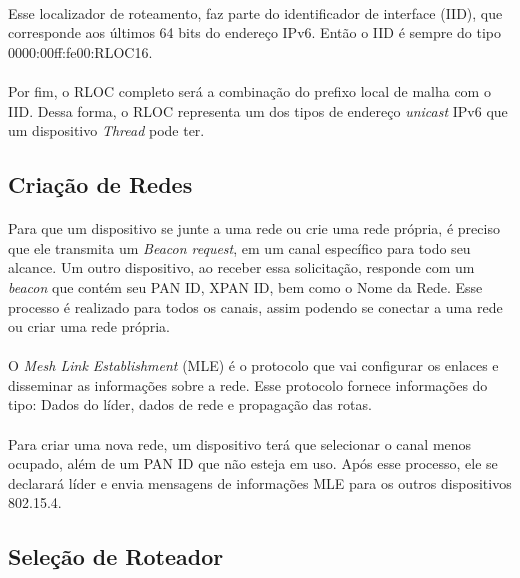 \paragraph{} Esse localizador de roteamento, faz parte do identificador de interface (IID), que corresponde aos últimos 64 bits do endereço IPv6. Então o IID é sempre do tipo 0000:00ff:fe00:RLOC16.

\paragraph{} Por fim, o RLOC completo será a combinação do prefixo local de malha com o IID. Dessa forma, o RLOC representa um dos tipos de endereço \textit{unicast} IPv6 que um dispositivo \textit{Thread} pode ter.

\subsection{Criação de Redes}
\paragraph{} Para que um dispositivo se junte a uma rede ou crie uma rede própria, é preciso que ele transmita um \textit{Beacon request}, em um canal específico para todo seu alcance. Um outro dispositivo, ao receber essa solicitação, responde com um \textit{beacon} que contém seu PAN ID, XPAN ID, bem como o Nome da Rede. Esse processo é realizado para todos os canais, assim podendo se conectar a uma rede ou criar uma rede própria.

\paragraph{} O \textit{Mesh Link Establishment} (MLE) é o protocolo que vai configurar os enlaces e disseminar as informações sobre a rede. Esse protocolo fornece informações do tipo: Dados do líder, dados de rede e propagação das rotas.

\paragraph{}Para criar uma nova rede, um dispositivo terá que selecionar o canal menos ocupado, além de um PAN ID que não esteja em uso. Após esse processo, ele se declarará líder e envia mensagens de informações MLE para os outros dispositivos 802.15.4.

\subsection{Seleção de Roteador} 
